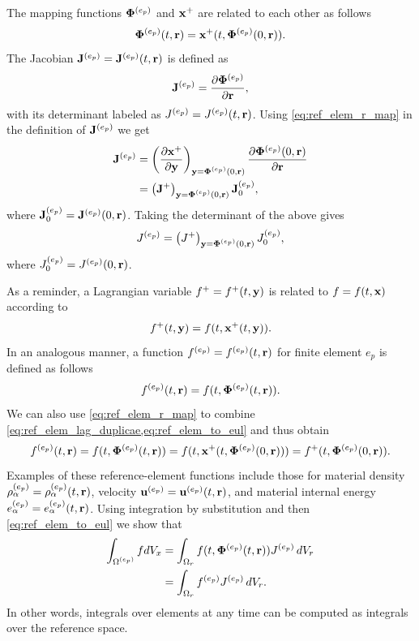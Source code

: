 \documentclass[11pt]{report}
\begin{document}
The mapping functions $\bm \Phi^{(e_p)}$ and $\mathbf{x}^+$ are related to each other as follows
\begin{equation}
    \label{eq:ref_elem_r_map}
    \bm \Phi^{(e_p)}(t,\mathbf{r}) = \mathbf{x}^+(t, \bm \Phi^{(e_p)}(0,\mathbf{r})).
\end{equation}
The Jacobian $\mathbf{J}^{(e_p)} = \mathbf{J}^{(e_p)}(t,\mathbf{r})$ is defined as 
\begin{equation}
    \mathbf{J}^{(e_p)} = \frac{ \partial \bm \Phi^{(e_p)} }{ \partial \mathbf{r} },
\end{equation}
with its determinant labeled as $J^{(e_p)} = J^{(e_p)}(t,\mathbf{r})$. Using \cref{eq:ref_elem_r_map} in the definition of $\mathbf{J}^{(e_p)}$ we get
\begin{align*}
    \mathbf{J}^{(e_p)} &= \left ( \frac{\partial \mathbf{x}^+}{\partial \mathbf{y}} \right )_{\mathbf{y} = \bm \Phi^{(e_p)}(0,\mathbf{r})} \frac{\partial \bm \Phi^{(e_p)}(0,\mathbf{r})}{\partial \mathbf{r}} \nonumber \\
    &= \left ( \mathbf{J}^+ \right )_{\mathbf{y} = \bm \Phi^{(e_p)}(0,\mathbf{r})} \mathbf{J}^{(e_p)}_0,
\end{align*}
where $\mathbf{J}^{(e_p)}_0 = \mathbf{J}^{(e_p)}(0,\mathbf{r})$.
Taking the determinant of the above gives
\begin{equation}
    \label{eq:ref_elem_det_J}
    J^{(e_p)} = \left ( J^+ \right )_{\mathbf{y} = \bm \Phi^{(e_p)}(0,\mathbf{r})} J^{(e_p)}_0,
\end{equation}
where $J^{(e_p)}_0 = J^{(e_p)}(0,\mathbf{r})$.

As a reminder, a Lagrangian variable $f^+=f^+(t,\mathbf{y})$ is related to $f=f(t,\mathbf{x})$ according to 
\begin{equation}
    \label{eq:ref_elem_lag_duplicae}
    f^+(t,\mathbf{y}) = f(t,\mathbf{x}^+(t,\mathbf{y})).
\end{equation}
In an analogous manner, a function $f^{(e_p)}=f^{(e_p)}(t,\mathbf{r})$ for finite element $e_p$ is defined as follows
\begin{equation}
    \label{eq:ref_elem_to_eul}
    f^{(e_p)}(t,\mathbf{r}) = f(t,\bm \Phi^{(e_p)}(t,\mathbf{r})).
\end{equation}
We can also use \cref{eq:ref_elem_r_map} to combine \cref{eq:ref_elem_lag_duplicae,eq:ref_elem_to_eul} and thus obtain
\begin{equation}
    \label{eq:ref_elem_to_lag}
    f^{(e_p)}(t,\mathbf{r}) = f(t,\bm \Phi^{(e_p)}(t,\mathbf{r})) = f(t,\mathbf{x}^+(t, \bm \Phi^{(e_p)}(0,\mathbf{r}))) = f^+(t,\bm \Phi^{(e_p)}(0,\mathbf{r})).
\end{equation}
Examples of these reference-element functions include those for material density $\rho^{(e_p)}_\alpha = \rho^{(e_p)}_\alpha(t,\mathbf{r})$, velocity $\mathbf{u}^{(e_p)} = \mathbf{u}^{(e_p)}(t,\mathbf{r})$, and material internal energy $e^{(e_p)}_\alpha = e^{(e_p)}_\alpha(t,\mathbf{r})$. Using integration by substitution and then \cref{eq:ref_elem_to_eul} we show that
\begin{align*}
    \int_{\Omega^{(e_p)}} f dV_x &= \int_{\Omega_r} f(t, \bm \Phi^{(e_p)}(t,\mathbf{r})) J^{(e_p)} \, dV_r \nonumber \\
    &= \int_{\Omega_r} f^{(e_p)} J^{(e_p)} \, dV_r.
\end{align*}
In other words, integrals over elements at any time can be computed as integrals over the reference space. 
\end{document}

